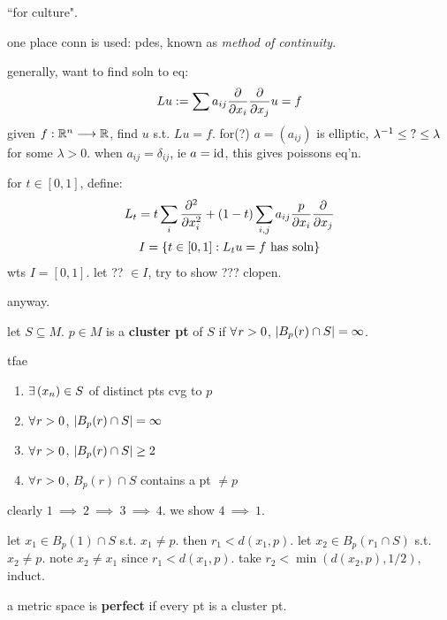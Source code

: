 ``for culture".

one place conn is used: pdes, known as \textit{method of continuity}.

generally, want to find soln to eq:
\begin{equation*}
    Lu:=\sum a_{ij}\frac{\partial}{\partial x_{i}}\frac{\partial}{\partial x_{j}}u = f
\end{equation*}
given $f:\mathbb{R}^{n}\longrightarrow\mathbb{R}$, find $u$ s.t. $Lu=f$.
for(?) $a=(a_{ij})$ is elliptic, $\lambda^{-1}\leq \textrm{?}\leq\lambda$
for some $\lambda>0$.
when $a_{ij}=\delta_{ij}$, ie $a=\textrm{id}$, this gives poissons eq'n.

for $t\in[0,1]$, define:
\begin{gather*}
    L_{t}=t\sum	_{i}\frac{\partial^{2}}{\partial x_{i}^{2}}
	+(1-t)\sum_{i,j}a_{ij}\frac{p}{\partial x_{i}}\frac{\partial}{\partial x_{j}} \\
	I=\left\{{t\in[0,1]:L_{t}u=f \textrm{ has soln}}\right\}
\end{gather*}
wts $I=[0,1]$. let ?? $\in I$, try to show ??? clopen.

anyway.

\begin{defn}
    let $S\subseteq M$. $p\in M$ is a \textbf{cluster pt} of $S$ if
	$\fa r>0$, $\abs{B_{p}(r)\cap S}=\infty$.
\end{defn}

\begin{thm}
    tfae
	\begin{enumerate}
	    \item $\ex(x_{n})\in S$ of distinct pts cvg to $p$
		\item $\fa r>0$, $\abs{B_{p}(r)\cap S}=\infty$
		\item $\fa r>0$, $\abs{B_{p}(r)\cap S}\geq2$
		\item $\fa r>0$, $B_{p}(r)\cap S$ contains a pt $\neq p$
	\end{enumerate}
\end{thm}

\begin{pf}[source=Primary Source Material]
    clearly $1 \ \implies \ 2 \ \implies \ 3 \ \implies \ 4$.
	we show $4 \ \implies \ 1$.

	let $x_{1}\in B_{p}(1)\cap S$ s.t. $x_{1}\neq p$.
	then $r_{1}<d(x_{1},p)$.
	let $x_{2}\in B_{p}(r_{1}\cap S)$ s.t. $x_{2}\neq p$.
	note $x_{2}\neq x_{1}$ since $r_{1}<d(x_{1},p)$.
	take $r_{2}<\min(d(x_{2},p),1/2)$, induct.
\end{pf}

\begin{defn}
    a metric space is \textbf{perfect} if every pt is a cluster pt.
\end{defn}

